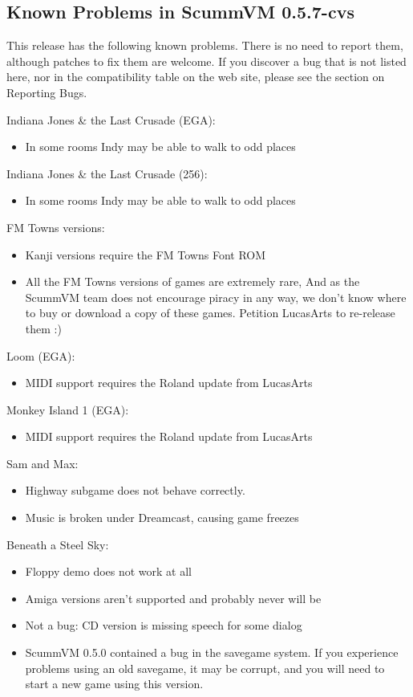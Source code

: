 

\subsection{Known Problems in ScummVM 0.5.7-cvs}

This release has the following known problems. There is no need to report them,
although patches to fix them are welcome. If you discover a bug that is not
listed here, nor in the compatibility table on the web site, please see
the section on Reporting Bugs.

Indiana Jones \& the Last Crusade (EGA):
  \begin{itemize}
  \item In some rooms Indy may be able to walk to odd places
  \end{itemize}
Indiana Jones \& the Last Crusade (256):
  \begin{itemize}
  \item In some rooms Indy may be able to walk to odd places
  \end{itemize}
FM Towns versions:
  \begin{itemize}
  \item Kanji versions require the FM Towns Font ROM
  \item All the FM Towns versions of games are extremely rare,
                  And as the ScummVM team does not encourage piracy in any
                  way, we don't know where to buy or download a copy of these
                  games. Petition LucasArts to re-release them :)
  \end{itemize}
Loom (EGA):
  \begin{itemize}
  \item MIDI support requires the Roland update from LucasArts
  \end{itemize}
Monkey Island 1 (EGA):
  \begin{itemize}
  \item MIDI support requires the Roland update from LucasArts
  \end{itemize}
Sam and Max:
  \begin{itemize}
  \item Highway subgame does not behave correctly.
  \item Music is broken under Dreamcast, causing game freezes
  \end{itemize}
Beneath a Steel Sky:
  \begin{itemize}
  \item Floppy demo does not work at all
  \item Amiga versions aren't supported and probably never will be
  \item Not a bug: CD version is missing speech for some dialog
  \item ScummVM 0.5.0 contained a bug in the savegame system.
                  If you experience problems using an old savegame, it may be
                  corrupt, and you will need to start a new game using this
                  version.
  \end{itemize}
